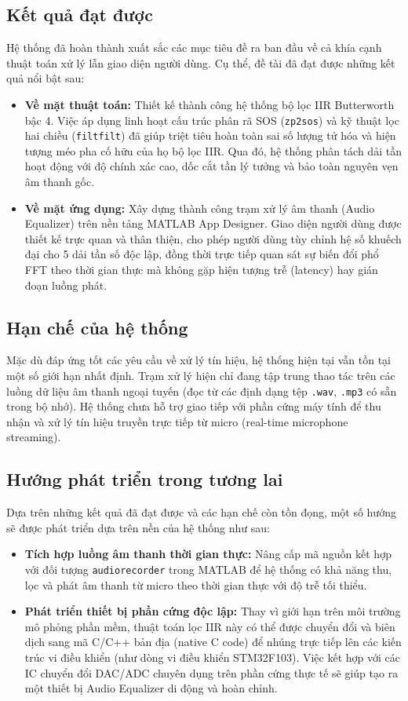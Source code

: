 \documentclass[12pt,a4paper]{article}
\begin{document}
\subsection{Kết quả đạt được}
Hệ thống đã hoàn thành xuất sắc các mục tiêu đề ra ban đầu về cả khía cạnh thuật toán xử lý lẫn giao diện người dùng. Cụ thể, đề tài đã đạt được những kết quả nổi bật sau:
\begin{itemize}[label=$\bullet$]
    \item \textbf{Về mặt thuật toán:} Thiết kế thành công hệ thống bộ lọc IIR Butterworth bậc 4. Việc áp dụng linh hoạt cấu trúc phân rã SOS (\texttt{zp2sos}) và kỹ thuật lọc hai chiều (\texttt{filtfilt}) đã giúp triệt tiêu hoàn toàn sai số lượng tử hóa và hiện tượng méo pha cố hữu của họ bộ lọc IIR. Qua đó, hệ thống phân tách dải tần hoạt động với độ chính xác cao, dốc cắt tần lý tưởng và bảo toàn nguyên vẹn âm thanh gốc.
    
    \item \textbf{Về mặt ứng dụng:} Xây dựng thành công trạm xử lý âm thanh (Audio Equalizer) trên nền tảng MATLAB App Designer. Giao diện người dùng được thiết kế trực quan và thân thiện, cho phép người dùng tùy chỉnh hệ số khuếch đại cho 5 dải tần số độc lập, đồng thời trực tiếp quan sát sự biến đổi phổ FFT theo thời gian thực mà không gặp hiện tượng trễ (latency) hay gián đoạn luồng phát.
\end{itemize}

\subsection{Hạn chế của hệ thống}
Mặc dù đáp ứng tốt các yêu cầu về xử lý tín hiệu, hệ thống hiện tại vẫn tồn tại một số giới hạn nhất định. Trạm xử lý hiện chỉ đang tập trung thao tác trên các luồng dữ liệu âm thanh ngoại tuyến (đọc từ các định dạng tệp \texttt{.wav}, \texttt{.mp3} có sẵn trong bộ nhớ). Hệ thống chưa hỗ trợ giao tiếp với phần cứng máy tính để thu nhận và xử lý tín hiệu truyền trực tiếp từ micro (real-time microphone streaming).

\subsection{Hướng phát triển trong tương lai}
Dựa trên những kết quả đã đạt được và các hạn chế còn tồn đọng, một số hướng sẽ được phát triển dựa trên nền của hệ thống như sau:
\begin{itemize}[label=$\bullet$]
    \item \textbf{Tích hợp luồng âm thanh thời gian thực:} Nâng cấp mã nguồn kết hợp với đối tượng \texttt{audiorecorder} trong MATLAB để hệ thống có khả năng thu, lọc và phát âm thanh từ micro theo thời gian thực với độ trễ tối thiểu.
    \item \textbf{Phát triển thiết bị phần cứng độc lập:} Thay vì giới hạn trên môi trường mô phỏng phần mềm, thuật toán lọc IIR này có thể được chuyển đổi và biên dịch sang mã C/C++ bản địa (native C code) để nhúng trực tiếp lên các kiến trúc vi điều khiển (như dòng vi điều khiển STM32F103). Việc kết hợp với các IC chuyển đổi DAC/ADC chuyên dụng trên phần cứng thực tế sẽ giúp tạo ra một thiết bị Audio Equalizer di động và hoàn chỉnh.
\end{itemize}
\end{document}
